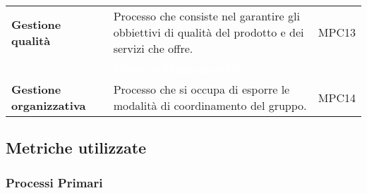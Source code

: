 {\begin{longtable}{C{3cm} | C{9.5cm} | C{2.5cm}}
	\textbf{Gestione qualità} &
	 Processo che consiste nel garantire gli obbiettivi di qualità del prodotto e dei servizi che offre. &
	MPC13 \\
	
 & \textcolor{white}{\textbf{Processi Organizzativi}} &  \\
 
	\textbf{Gestione organizzativa} & 
	Processo che si occupa di esporre le modalità di coordinamento del gruppo. &
	MPC14 \\
	
\end{longtable}	

}

\newpage

\subsection{Metriche utilizzate}


\subsubsection{Processi Primari}

